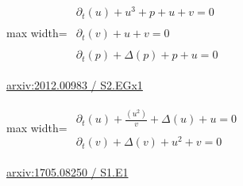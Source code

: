\documentclass[UTF8,10pt,a4paper,fontset=mac]{ctexart}
\begin{document}
\begin{minipage}{\linewidth}\begin{center}\begin{adjustbox}{max width=\linewidth}$\displaystyle\begin{gathered}\begin{gathered}\partial_{t}(u)+u^{3}+p+u+v=0\end{gathered}\\[5pt]\begin{gathered}\partial_{t}(v)+u+v=0\end{gathered}\\[5pt]\begin{gathered}\partial_{t}(p)+\Delta(p)+p+u=0\end{gathered}\end{gathered}$\end{adjustbox}\end{center}{\small\href{https://arxiv.org/html/2012.00983#S2.EGx1}{arxiv:2012.00983 / S2.EGx1}}\par\end{minipage}\par\vspace{6mm}

\begin{minipage}{\linewidth}\begin{center}\begin{adjustbox}{max width=\linewidth}$\displaystyle\begin{gathered}\begin{gathered}\partial_{t}(u)+\frac{(u^{2})}{v}+\Delta(u)+u=0\end{gathered}\\[5pt]\begin{gathered}\partial_{t}(v)+\Delta(v)+u^{2}+v=0\end{gathered}\end{gathered}$\end{adjustbox}\end{center}{\small\href{https://arxiv.org/html/1705.08250#S1.E1}{arxiv:1705.08250 / S1.E1}}\par\end{minipage}\par\vspace{6mm}
\end{document}

